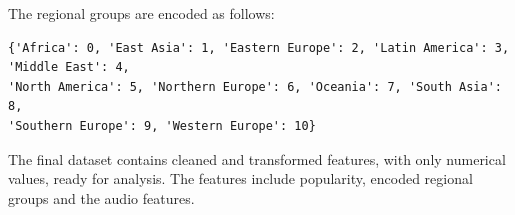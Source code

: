 The regional groups are encoded as follows:
\begin{verbatim}
{'Africa': 0, 'East Asia': 1, 'Eastern Europe': 2, 'Latin America': 3, 'Middle East': 4, 
'North America': 5, 'Northern Europe': 6, 'Oceania': 7, 'South Asia': 8, 
'Southern Europe': 9, 'Western Europe': 10}
\end{verbatim}




The final dataset contains cleaned and transformed features, with only numerical values, ready for analysis. The features include popularity, encoded regional groups and the audio features.

